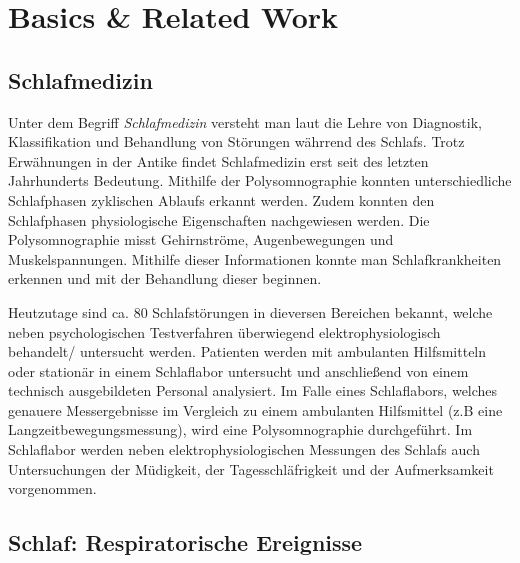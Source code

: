 
\chapter{Basics \& Related Work}
\label{ch:Basics}

\section{Schlafmedizin}
\label{ch:Basics:se:schlafmedizin}
Unter dem Begriff \textit{Schlafmedizin} versteht man laut \cite{schlafmedizin_1x1} die Lehre von Diagnostik, Klassifikation und Behandlung von Störungen währrend des Schlafs. 
Trotz Erwähnungen in der Antike findet Schlafmedizin erst seit des letzten Jahrhunderts Bedeutung.
Mithilfe der Polysomnographie konnten unterschiedliche Schlafphasen zyklischen Ablaufs erkannt werden.
Zudem konnten den Schlafphasen physiologische Eigenschaften nachgewiesen werden.
Die Polysomnographie misst Gehirnströme, Augenbewegungen und Muskelspannungen.
Mithilfe dieser Informationen konnte man Schlafkrankheiten erkennen und mit der Behandlung dieser beginnen.


Heutzutage sind ca. 80 Schlafstörungen in dieversen Bereichen bekannt, welche neben psychologischen Testverfahren überwiegend elektrophysiologisch behandelt/ untersucht werden.
Patienten werden mit ambulanten Hilfsmitteln oder stationär in einem Schlaflabor untersucht und anschließend von einem technisch ausgebildeten Personal analysiert.
Im Falle eines Schlaflabors, welches genauere Messergebnisse im Vergleich zu einem ambulanten Hilfsmittel (z.B eine Langzeitbewegungsmessung), wird eine Polysomnographie durchgeführt.
Im Schlaflabor werden neben elektrophysiologischen Messungen des Schlafs auch Untersuchungen der Müdigkeit, der Tagesschläfrigkeit und der Aufmerksamkeit \cite{schlafmedizin_1x1} vorgenommen.


\section{Schlaf: Respiratorische Ereignisse}


